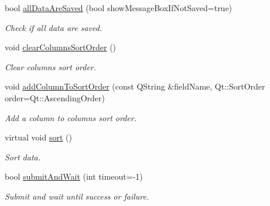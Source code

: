 \begin{DoxyCompactItemize}
bool \hyperlink{classmdt_abstract_sql_widget_ae83b8677a38ccb7c00b9ebfeebae69c8}{all\-Data\-Are\-Saved} (bool show\-Message\-Box\-If\-Not\-Saved=true)
\begin{DoxyCompactList}\small\item\em Check if all data are saved. \end{DoxyCompactList}\item 
void \hyperlink{classmdt_abstract_sql_widget_abe9677dd1d70d5e67349f6fa6d2216ae}{clear\-Columns\-Sort\-Order} ()
\begin{DoxyCompactList}\small\item\em Clear columns sort order. \end{DoxyCompactList}\item 
void \hyperlink{classmdt_abstract_sql_widget_a3c03a6c43f4488b377aa72879c10e066}{add\-Column\-To\-Sort\-Order} (const Q\-String \&field\-Name, Qt\-::\-Sort\-Order order=Qt\-::\-Ascending\-Order)
\begin{DoxyCompactList}\small\item\em Add a column to columns sort order. \end{DoxyCompactList}\item 
virtual void \hyperlink{classmdt_abstract_sql_widget_a2c83a26fe75b708948c80a51887075e9}{sort} ()
\begin{DoxyCompactList}\small\item\em Sort data. \end{DoxyCompactList}\item 
bool \hyperlink{classmdt_abstract_sql_widget_a903905036e9c6b440e2a300f48579b2b}{submit\-And\-Wait} (int timeout=-\/1)
\begin{DoxyCompactList}\small\item\em Submit and wait until success or failure. \end{DoxyCompactList}\end{DoxyCompactItemize}
